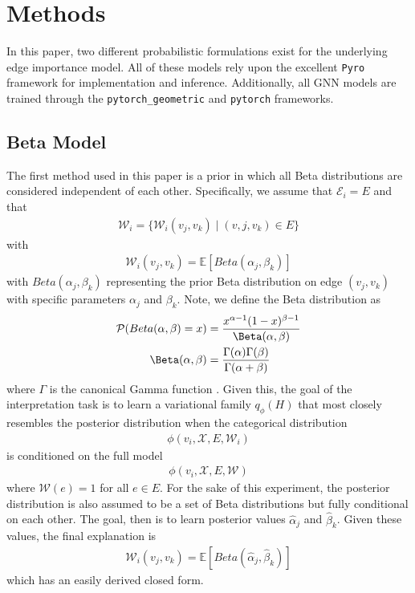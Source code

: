 \section{Methods}
In this paper, two different probabilistic formulations exist for the underlying edge importance model. All of these models rely upon the excellent \verb|Pyro| \cite{bingham_pyro_2018} framework for implementation and inference. Additionally, all GNN models are trained through the \verb|pytorch_geometric| \cite{fey_fast_2019} and \verb|pytorch| \cite{paszke_pytorch_2019} frameworks.

\subsection{Beta Model}
The first method used in this paper is a prior in which all Beta distributions are considered independent of each other. Specifically, we assume that $\mathcal{E}_i = E$ and that
\begin{align*}
	\mathcal{W}_i = \{\mathcal{W}_i(v_j , v_k) \mid (v,j, v_k) \in E\}
\end{align*}
with
\begin{align*}
	\mathcal{W}_i(v_j, v_k) = \mathbb{E}[Beta(\alpha_{j}, \beta_{k})]
\end{align*}
with $Beta(\alpha_{j}, \beta_{k})$ representing the prior Beta distribution on edge $(v_j, v_k)$ with specific parameters $\alpha_{j}$ and $\beta_{k}$. Note, we define the Beta distribution as
\begin{align*}
	\mathcal{P}(Beta(\alpha, \beta) = x) &= \frac{x^{\alpha - 1}(1-x)^{\beta - 1}}{\Beta(\alpha, \beta)} \\
	\Beta(\alpha, \beta) &= \frac{\Gamma(\alpha)\Gamma(\beta)}{\Gamma(\alpha + \beta)}
\end{align*}
where $\Gamma$ is the canonical Gamma function \cite{noauthor_continuous_nodate}. Given this, the goal of the interpretation task is to learn a variational family $q_{\phi}(H)$ that most closely resembles the posterior distribution when the categorical distribution
\begin{align*}
	\phi(v_i, \mathcal{X}, E, \mathcal{W}_i)
\end{align*}
is conditioned on the full model
\begin{align*}
	\phi(v_i, \mathcal{X}, E, \mathcal{W})
\end{align*}
where $\mathcal{W}(e) = 1$ for all $e \in E$. For the sake of this experiment, the posterior distribution is also assumed to be a set of Beta distributions but fully conditional on each other. The goal, then is to learn posterior values $\hat{\alpha}_{j}$ and $\hat{\beta}_{k}$. Given these values, the final explanation is
\begin{align*}
	\mathcal{W}_i(v_j, v_k) = \mathbb{E}[Beta(\hat{\alpha}_{j}, \hat{\beta}_{k})]
\end{align*}
which has an easily derived closed form.

